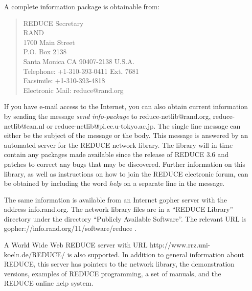 A complete information package is obtainable from:
\begin{quote}
       REDUCE Secretary \\
       RAND \\
       1700 Main Street \\
       P.O. Box 2138 \\
       Santa Monica CA 90407-2138 U.S.A. \\
       Telephone: +1-310-393-0411 Ext. 7681 \\
       Facsimile: +1-310-393-4818 \\
       Electronic Mail: reduce@rand.org
\end{quote}
\vspace*{-0.1in}

If you have e-mail access to the Internet, you can also obtain current
information by sending the message {\em send info-package} to
reduce-netlib@rand.org, reduce-netlib@can.nl or
reduce-netlib@pi.cc.u-tokyo.ac.jp.  The single line message can either be
the subject of the message or the body.  This message is answered by an
automated server for the REDUCE network library.  The library will in time
contain any packages made available since the release of REDUCE 3.6 and
patches to correct any bugs that may be discovered.  Further information
on this library, as well as instructions on how to join the REDUCE
electronic forum, can be obtained by including the word {\em help} on a
separate line in the message.

The same information is available from an Internet gopher server with
the address info.rand.org.  The network library files are in a ``REDUCE
Library'' directory under the directory ``Publicly Available Software''.
The relevant URL is gopher://info.rand.org/11/software/reduce .

A World Wide Web REDUCE server with URL http://www.rrz.uni-koeln.de/REDUCE/
is also supported.  In addition to general information about REDUCE, this
server has pointers to the network library, the demonstration versions,
examples of REDUCE programming, a set of manuals, and the REDUCE online
help system.


